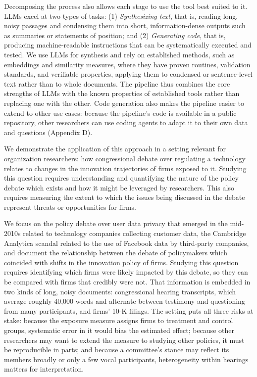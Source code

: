 \documentclass[11pt]{article}
\begin{document}
Decomposing the process also allows each stage to use the tool best suited to it. LLMs excel at two types of tasks: (1) \textit{Synthesizing text}, that is, reading long, noisy passages and condensing them into short, information-dense outputs such as summaries or statements of position; and (2) \textit{Generating code}, that is, producing machine-readable instructions that can be systematically executed and tested. We use LLMs for synthesis and rely on established methods, such as embeddings and similarity measures, where they have proven routines, validation standards, and verifiable properties, applying them to condensed or sentence-level text rather than to whole documents. The pipeline thus combines the core strengths of LLMs with the known properties of established tools rather than replacing one with the other. Code generation also makes the pipeline easier to extend to other use cases: because the pipeline's code is available in a public repository, other researchers can use coding agents to adapt it to their own data and questions (Appendix D).

We demonstrate the application of this approach in a setting relevant for organization researchers: how congressional debate over regulating a technology relates to changes in the innovation trajectories of firms exposed to it. Studying this question requires understanding and quantifying the nature of the policy debate which exists and how it might be leveraged by researchers. This also requires measuring the extent to which the issues being discussed in the debate represent threats or opportunities for firms.

We focus on the policy debate over user data privacy that emerged in the mid-2010s related to technology companies collecting customer data, the Cambridge Analytica scandal related to the use of Facebook data by third-party companies, and document the relationship between the debate of policymakers which coincided with shifts in the innovation policy of firms. Studying this question requires identifying which firms were likely impacted by this debate, so they can be compared with firms that credibly were not. That information is embedded in two kinds of long, noisy documents: congressional hearing transcripts, which average roughly 40,000 words and alternate between testimony and questioning from many participants, and firms' 10-K filings. The setting puts all three risks at stake: because the exposure measure assigns firms to treatment and control groups, systematic error in it would bias the estimated effect; because other researchers may want to extend the measure to studying other policies, it must be reproducible in parts; and because a committee's stance may reflect its members broadly or only a few vocal participants, heterogeneity within hearings matters for interpretation.
\end{document}
